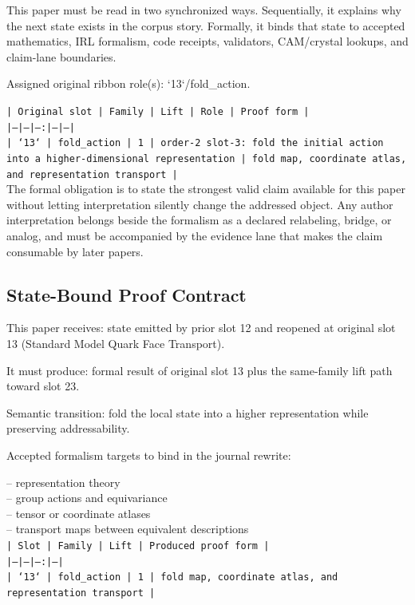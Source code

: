 \documentclass[11pt]{article}
\begin{document}
This paper must be read in two synchronized ways. Sequentially, it explains why
the next state exists in the corpus story. Formally, it binds that state to
accepted mathematics, IRL formalism, code receipts, validators, CAM/crystal
lookups, and claim-lane boundaries.

Assigned original ribbon role(s): `13`/fold\_action.

\noindent\texttt{| Original slot | Family | Lift | Role | Proof form |}\\
\noindent\texttt{|---|---|---:|---|---|}\\
\noindent\texttt{| `13` | fold\_action | 1 | order-2 slot-3: fold the initial action into a higher-dimensional representation | fold map, coordinate atlas, and representation transport |}\\

The formal obligation is to state the strongest valid claim available for this
paper without letting interpretation silently change the addressed object. Any
author interpretation belongs beside the formalism as a declared relabeling,
bridge, or analog, and must be accompanied by the evidence lane that makes the
claim consumable by later papers.

\subsection*{State-Bound Proof Contract}

This paper receives: state emitted by prior slot 12 and reopened at original slot 13 (Standard Model Quark Face Transport).

It must produce: formal result of original slot 13 plus the same-family lift path toward slot 23.

Semantic transition: fold the local state into a higher representation while preserving addressability.

Accepted formalism targets to bind in the journal rewrite:

\noindent{}-- representation theory\\
\noindent{}-- group actions and equivariance\\
\noindent{}-- tensor or coordinate atlases\\
\noindent{}-- transport maps between equivalent descriptions\\

\noindent\texttt{| Slot | Family | Lift | Produced proof form |}\\
\noindent\texttt{|---|---|---:|---|}\\
\noindent\texttt{| `13` | fold\_action | 1 | fold map, coordinate atlas, and representation transport |}\\
\end{document}
